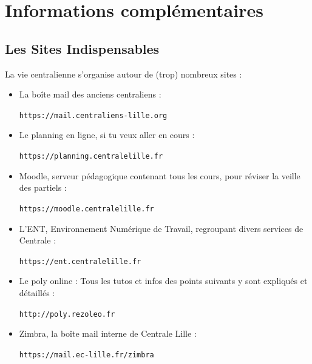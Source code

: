 \documentclass[12pt]{article}
\begin{document}
{\begin{description}
  \end{description}

\section{Informations complémentaires}

  \subsection{Les Sites Indispensables}
    La vie centralienne s’organise autour de (trop) nombreux sites :
    \newline
    \begin{itemize}
      \item La boîte mail des anciens centraliens :
      \begin{center}
	\verb|https://mail.centraliens-lille.org|
      \end{center}
    \item Le planning en ligne, si tu veux aller en cours :
    \begin{center}
      \verb|https://planning.centralelille.fr|
    \end{center}
    \item Moodle, serveur pédagogique contenant tous les cours, pour réviser la veille des partiels : 
    \begin{center}
      \verb|https://moodle.centralelille.fr|
    \end{center}
    \item L’ENT, Environnement Numérique de Travail, regroupant divers services de Centrale : 
    \begin{center}
      \verb|https://ent.centralelille.fr|
    \end{center}
    \item Le poly online : Tous les tutos et infos des points suivants y sont expliqués et détaillés : 
    \begin{center}
      \verb|http://poly.rezoleo.fr|
    \end{center}
    \item Zimbra, la boîte mail interne de Centrale Lille :
    \begin{center}
      \verb|https://mail.ec-lille.fr/zimbra|
    \end{center}
    \end{itemize}
}
\end{document}
